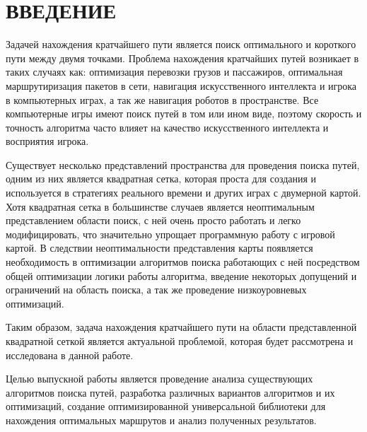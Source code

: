 \section*{ВВЕДЕНИЕ}

\vspace{1\baselineskip} 

Задачей нахождения кратчайшего пути является поиск оптимального и короткого пути между двумя точками. Проблема нахождения кратчайших путей возникает в таких случаях как: оптимизация перевозки грузов и пассажиров, оптимальная маршрутиризация пакетов в сети, навигация искусственного интеллекта и игрока в компьютерных играх, а так же навигация роботов в пространстве. Все компьютерные игры имеют поиск путей в том или ином виде, поэтому скорость и точность алгоритма часто влияет на качество искусственного интеллекта и восприятия игрока. 

Существует несколько представлений пространства для проведения поиска путей, одним из них является квадратная сетка, которая проста для создания и используется в стратегиях реального времени и других играх с двумерной картой. Хотя квадратная сетка в большинстве случаев является неоптимальным представлением области поиск, с ней очень просто работать и легко модифицировать, что значительно упрощает программную работу с игровой картой. В следствии неоптимальности представления карты появляется необходимость в оптимизации алгоритмов поиска работающих с ней посредством общей оптимизации логики работы алгоритма, введение некоторых допущений и ограничений на область поиска, а так же проведение низкоуровневых оптимизаций.

Таким образом, задача нахождения кратчайшего пути на области представленной квадратной сеткой является актуальной проблемой, которая будет рассмотрена и исследована в данной работе.

Целью выпускной работы является проведение анализа существующих алгоритмов поиска путей, разработка различных вариантов алгоритмов и их оптимизаций, создание оптимизированной универсальной библиотеки для нахождения оптимальных маршрутов и анализ полученных результатов.

